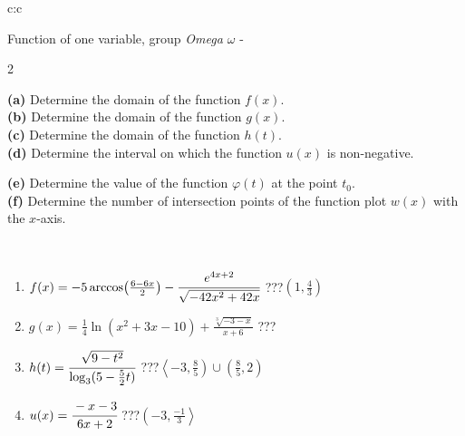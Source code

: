 \documentclass[10pt]{report}
\begin{document}
\begin{tabular}{c:c}
\begin{minipage}[c][104.5mm][t]{0.5\linewidth}
\begin{center}
\vspace{7mm}
{\huge Function of one variable, group \textit{Omega $\omega$} -}\\[5mm]
\begin{minipage}{0.95\linewidth}
\begin{center}
{\small \begin{multicols}{2} \raggedright
\textbf{(a)} Determine the domain of the function \(f(x)\). \\[1mm]
\textbf{(b)} Determine the domain of the function \(g(x)\). \\[1mm]
\textbf{(c)} Determine the domain of the function \(h(t)\). \\[1mm]
\textbf{(d)} Determine the interval on which the function \(u(x)\) is non-negative. \par \columnbreak
\textbf{(e)} Determine the value of the function \(\varphi(t)\) at the point \(t_0\). \\[1mm]
\textbf{(f)} Determine the number of intersection points of the function plot \(w(x)\) with the \(x\)-axis. \\[1mm]
\end{multicols}
}
\end{center}
\end{minipage}
\\[4mm]
\begin{minipage}{0.79\linewidth}
\begin{center}
\begin{varwidth}{\linewidth}
\begin{enumerate}
\small
\item $f(x) = -5\arccos\!\left( \frac{6-6x}{2} \right) - \cfrac{e^{4x+2}}{\sqrt{-42x^2+42x}}$\quad \dotfill\; ???\;\dotfill \quad $\left(1 , \frac{4}{3}\right)$
\item $g(x) = \frac{1}{4} \ln{\!(x^2+3x-10)}+\frac{\sqrt[3]{-3-x}}{x+6}$\quad \dotfill\; ???\;\dotfill {}
\item $h(t) = \cfrac{\sqrt{9-t^2}}{\log_3(5-\frac{5}{2}t)}$\quad \dotfill\; ???\;\dotfill \quad $\left\langle-3 , \frac{8}{5}\right)\cup\left(\frac{8}{5} , 2\right)$
\item $u(x) = \cfrac{-x-3}{6x+2}$\quad \dotfill\; ???\;\dotfill \quad $\left(-3 , \frac{-1}{3}\right\rangle$

\end{enumerate}
\end{varwidth}
\end{center}
\end{minipage}
\end{center}
\end{minipage}
\end{tabular}
\end{document}
